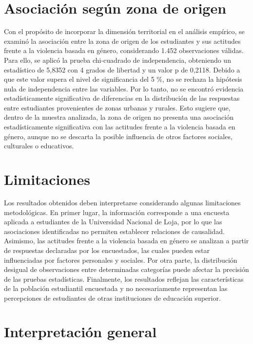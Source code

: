 \documentclass[
  spanish,
  11pt,
  letterpaper,
  DIV=11,
  numbers=noendperiod]{scrreprt}
\begin{document}
\section{Asociación según zona de
origen}\label{asociaciuxf3n-seguxfan-zona-de-origen}

Con el propósito de incorporar la dimensión territorial en el análisis
empírico, se examinó la asociación entre la zona de origen de los
estudiantes y sus actitudes frente a la violencia basada en género,
considerando 1.452 observaciones válidas. Para ello, se aplicó la prueba
chi-cuadrado de independencia, obteniendo un estadístico de 5,8352 con 4
grados de libertad y un valor p de 0,2118. Debido a que este valor
supera el nivel de significancia del 5 \%, no se rechaza la hipótesis
nula de independencia entre las variables. Por lo tanto, no se encontró
evidencia estadísticamente significativa de diferencias en la
distribución de las respuestas entre estudiantes provenientes de zonas
urbanas y rurales. Esto sugiere que, dentro de la muestra analizada, la
zona de origen no presenta una asociación estadísticamente significativa
con las actitudes frente a la violencia basada en género, aunque no se
descarta la posible influencia de otros factores sociales, culturales o
educativos.

\section{Limitaciones}\label{limitaciones}

Los resultados obtenidos deben interpretarse considerando algunas
limitaciones metodológicas. En primer lugar, la información corresponde
a una encuesta aplicada a estudiantes de la Universidad Nacional de
Loja, por lo que las asociaciones identificadas no permiten establecer
relaciones de causalidad. Asimismo, las actitudes frente a la violencia
basada en género se analizan a partir de respuestas declaradas por los
encuestados, las cuales pueden estar influenciadas por factores
personales y sociales. Por otra parte, la distribución desigual de
observaciones entre determinadas categorías puede afectar la precisión
de las pruebas estadísticas. Finalmente, los resultados reflejan las
características de la población estudiantil encuestada y no
necesariamente representan las percepciones de estudiantes de otras
instituciones de educación superior.

\section{Interpretación general}\label{interpretaciuxf3n-general}
\end{document}
